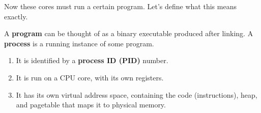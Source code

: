 \documentclass{article}
\newcounter{definition}[section]
\newcounter{code}[section]
\begin{document}
    Now these cores must run a certain program. Let's define what this means exactly. 

    \begin{definition}
      \label{def:program-process}
      A \textbf{program} can be thought of as a binary executable produced after linking. A \textbf{process} is a running instance of some program. 
      \begin{enumerate}
        \item It is identified by a \textbf{process ID (PID)} number. 
        \item It is run on a CPU core, with its own registers. 
        \item It has its own virtual address space, containing the code (instructions), heap, and pagetable that maps it to physical memory. 
      \end{enumerate}
    \end{definition}
\end{document}
